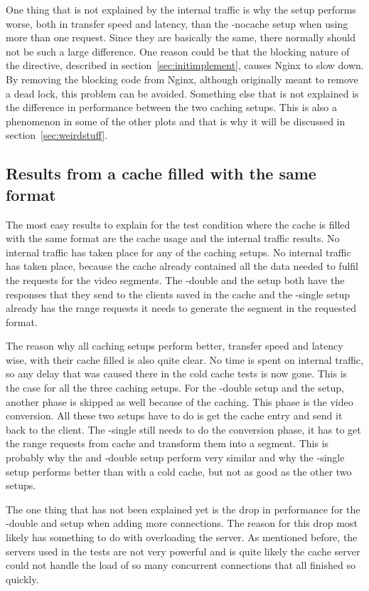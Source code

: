 \documentclass[twoside,openright]{uva-bachelor-thesis}
\begin{document}
One thing that is not explained by the internal traffic is why the \ipp setup
performs worse, both in transfer speed and latency, than the \lt-nocache setup
when using more than one request.  Since they are basically the same, there
normally should not be such a large difference. One reason could be that the
blocking nature of the \ipp directive, described in
section~\ref{sec:initimplement}, causes Nginx to slow down. By removing the
blocking code from Nginx, although originally meant to remove a dead lock, this
problem can be avoided. Something else that is not explained is the difference
in performance between the two caching \lt setups. This is also a phenomenon in
some of the other plots and that is why it will be discussed in
section~\ref{sec:weirdstuff}.


\subsection{Results from a cache filled with the same
format}\label{sec:discusssame}
The most easy results to explain for the test condition where the cache is
filled with the same format are the cache usage and the internal traffic
results. No internal traffic has taken place for any of the caching setups. No
internal traffic has taken place, because the cache already contained all the
data needed to fulfil the requests for the video segments. The \lt-double and
the \cdn setup both have the responses that they send to the clients saved in
the cache and the \lt-single setup already has the range requests it needs to
generate the segment in the requested format.

The reason why all caching setups perform better, transfer speed and latency
wise, with their cache filled is also quite clear. No time is spent on internal
traffic, so any delay that was caused there in the cold cache tests is now gone.
This is the case for all the three caching setups. For the \lt-double setup and
the \cdn setup, another phase is skipped as well because of the caching. This
phase is the video conversion. All these two setups have to do is get the cache
entry and send it back to the client. The \lt-single still needs to do the
conversion phase, it has to get the range requests from cache and transform them
into a segment. This is probably why the \cdn and \lt-double setup perform very
similar and why the \lt-single setup performs better than with a cold cache, but
not as good as the other two setups.

The one thing that has not been explained yet is the drop in performance for the
\lt-double and \cdn setup when adding more connections. The reason for this drop
most likely has something to do with overloading the server. As mentioned
before, the servers used in the tests are not very powerful and is quite likely
the cache server could not handle the load of so many concurrent connections
that all finished so quickly.
\end{document}

